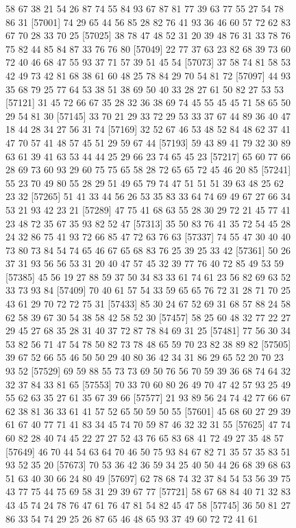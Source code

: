 \documentclass{article}
\begin{document}
\begin{figure}[H]
\begin{Schunk}
\begin{Soutput}
[56977] 58 67 38 21 54 26 87 74 55 84 93 67 87 81 77 39 63 77 55 27 54 78 86 31
[57001] 74 29 65 44 56 85 28 82 76 41 93 36 46 60 57 72 62 83 67 70 28 33 70 25
[57025] 38 78 47 48 52 31 20 39 48 76 31 33 78 76 75 82 44 85 84 87 33 76 76 80
[57049] 22 77 37 63 23 82 68 39 73 60 72 40 46 68 47 55 93 37 71 57 39 51 45 54
[57073] 37 58 74 81 58 53 42 49 73 42 81 68 38 61 60 48 25 78 84 29 70 54 81 72
[57097] 44 93 35 68 79 25 77 64 53 38 51 38 69 50 40 33 28 27 61 50 82 27 53 53
[57121] 31 45 72 66 67 35 28 32 36 38 69 74 45 55 45 45 71 58 65 50 29 54 81 30
[57145] 33 70 21 29 33 72 29 53 33 37 67 44 89 36 40 47 18 44 28 34 27 56 31 74
[57169] 32 52 67 46 53 48 52 84 48 62 37 41 47 70 57 41 48 57 45 51 29 59 67 44
[57193] 59 43 89 41 79 32 30 89 63 61 39 41 63 53 44 44 25 29 66 23 74 65 45 23
[57217] 65 60 77 66 28 69 73 60 93 29 60 75 75 65 58 28 72 65 65 72 45 46 20 85
[57241] 55 23 70 49 80 55 28 29 51 49 65 79 74 47 51 51 51 39 63 48 25 62 23 32
[57265] 51 41 33 44 56 26 53 35 83 33 64 74 69 49 67 27 66 34 53 21 93 42 23 21
[57289] 47 75 41 68 63 55 28 30 29 72 21 45 77 41 23 48 72 35 67 35 93 82 52 47
[57313] 35 50 83 76 41 35 72 54 45 28 24 32 86 75 41 93 72 66 85 47 72 63 76 63
[57337] 74 55 47 30 40 40 73 80 73 84 54 74 65 46 67 65 68 83 76 25 39 25 33 42
[57361] 50 26 37 31 93 56 56 53 31 20 40 47 57 45 32 39 77 76 40 72 85 49 53 59
[57385] 45 56 19 27 88 59 37 50 34 83 33 61 74 61 23 56 82 69 63 52 33 73 93 84
[57409] 70 40 61 57 54 33 59 65 65 76 72 31 28 71 70 25 43 61 29 70 72 72 75 31
[57433] 85 30 24 67 52 69 31 68 57 88 24 58 62 58 39 67 30 54 38 58 42 58 52 30
[57457] 58 25 60 48 32 77 22 27 29 45 27 68 35 28 31 40 37 72 87 78 84 69 31 25
[57481] 77 56 30 34 53 82 56 71 47 54 78 50 82 73 78 48 65 59 70 23 82 38 89 82
[57505] 39 67 52 66 55 46 50 50 29 40 80 36 42 34 31 86 29 65 52 20 70 23 93 52
[57529] 69 59 88 55 73 73 69 50 76 56 70 59 39 36 68 74 64 32 32 37 84 33 81 65
[57553] 70 33 70 60 80 26 49 70 47 42 57 93 25 49 55 62 63 35 27 61 35 67 39 66
[57577] 21 93 89 56 24 74 42 77 66 67 62 38 81 36 33 61 41 57 52 65 50 59 50 55
[57601] 45 68 60 27 29 39 61 67 40 77 71 41 83 34 45 74 70 59 87 46 32 32 31 55
[57625] 47 74 60 82 28 40 74 45 22 27 27 52 43 76 65 83 68 41 72 49 27 35 48 57
[57649] 46 70 44 54 63 64 70 46 50 75 93 84 67 82 71 35 57 35 83 51 93 52 35 20
[57673] 70 53 36 42 36 59 34 25 40 50 44 26 68 39 68 63 51 63 40 30 66 24 80 49
[57697] 62 78 68 74 32 37 84 54 53 56 39 75 43 77 75 44 75 69 58 31 29 39 67 77
[57721] 58 67 68 84 40 71 32 83 43 45 74 24 78 76 47 61 76 47 81 54 82 45 47 58
[57745] 36 50 81 27 86 33 54 74 29 25 26 87 65 46 48 65 93 37 49 60 72 72 41 61

\end{Soutput}
\end{Schunk}
\end{figure}
\end{document}
